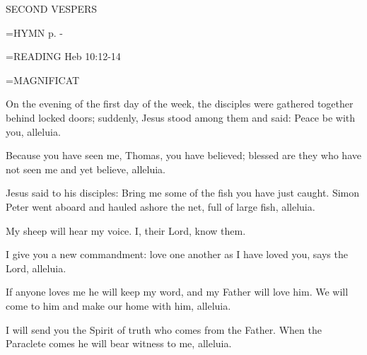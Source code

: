 \begin{flushleft}\normalsize SECOND VESPERS\\\end{flushleft}

\hangindent=\parindent \small{\uppercase{HYMN} p. \pageref{easter:firstHymn}-\pageref{easter:lastHymn}\\}

\hangindent=\parindent \small{\uppercase{READING}}    Heb 10:12-14 \textbf{   \\}

\hangindent=\parindent \small MAGNIFICAT
\begin{description}[labelindent=\parindent, leftmargin=*]
\item [Easter Sunday:] 	On the evening of the first day of the week, the disciples were gathered together behind locked doors; suddenly, Jesus stood among them and said: Peace be with you, alleluia.
\item [Divine Mercy Sunday:] 	Because you have seen me, Thomas, you have believed; blessed are they who have not seen me and yet believe, alleluia.
\item [3rd Sunday:] 		Jesus said to his disciples: Bring me some of the fish you have just caught. Simon Peter went aboard and hauled ashore the net, full of large fish, alleluia.
\item [4th Sunday:] 		My sheep will hear my voice. I, their Lord, know them.
\item [5th Sunday:] 		I give you a new commandment: love one another as I have loved you, says the Lord, alleluia.
\item [6th Sunday:] 		If anyone loves me he will keep my word, and my Father will love him. We will come to him and make our home with him, alleluia.
\item [7th Sunday:] 		I will send you the Spirit of truth who comes from the Father. When the Paraclete comes he will bear witness to me, alleluia.
\end{description}
